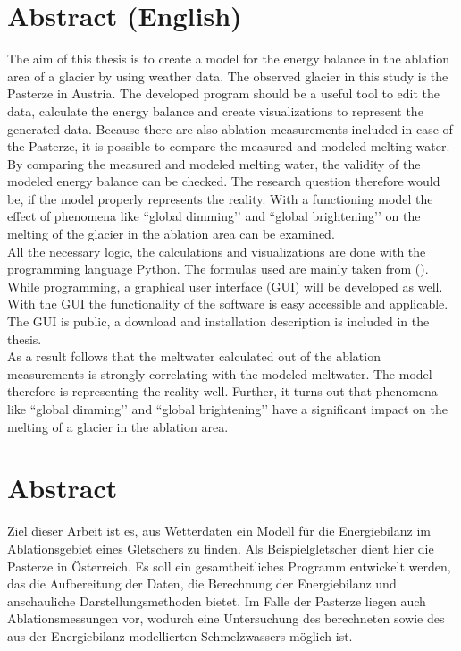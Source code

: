 \documentclass[11pt,a4paper]{article}
\begin{document}
\pagebreak
\ofoot{{\small \pagemark}}
\section*{Abstract (English)}
The aim of this thesis is to create a model for the energy balance in the ablation area of a glacier by using weather data. The observed glacier in this study is the Pasterze in Austria. The developed program should be a useful tool to edit the data, calculate the energy balance and create visualizations to represent the generated data. Because there are also ablation measurements included in case of the Pasterze, it is possible to compare the measured and modeled melting water.\\

By comparing the measured and modeled melting water, the validity of the modeled energy balance can be checked. The research question therefore would be, if the model properly represents the reality. With a functioning model the effect of phenomena like ``global dimming’’ and ``global brightening’’ on the melting of the glacier in the ablation area can be examined.\\

All the necessary logic, the calculations and visualizations are done with the programming language Python. The formulas used are mainly taken from \citeauthor{ThePhysicsOfGlaciers} (\citeyear[153-157]{ThePhysicsOfGlaciers}). While programming, a graphical user interface (GUI) will be developed as well. With the GUI the functionality of the software is easy accessible and applicable. The GUI is public, a download and installation description is included in the thesis.\\

As a result follows that the meltwater calculated out of the ablation measurements is strongly correlating with  the modeled meltwater. The model therefore is representing the reality well. Further, it turns out that phenomena like ``global dimming’’ and ``global brightening’’ have a significant impact on the melting of a glacier in the ablation area.
 
\pagebreak
\section*{Abstract}

Ziel dieser Arbeit ist es, aus Wetterdaten ein Modell für die Energiebilanz im Ablationsgebiet eines Gletschers zu finden. Als Beispielgletscher dient hier die Pasterze in Österreich. Es soll ein gesamtheitliches Programm entwickelt werden, das die Aufbereitung der Daten, die Berechnung der Energiebilanz und anschauliche Darstellungsmethoden bietet. Im Falle der Pasterze liegen auch Ablationsmessungen vor, wodurch eine Untersuchung des berechneten sowie des aus der Energiebilanz modellierten Schmelzwassers möglich ist.\\
\end{document}
